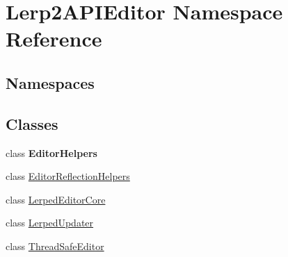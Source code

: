 \hypertarget{namespace_lerp2_a_p_i_editor}{}\section{Lerp2\+A\+P\+I\+Editor Namespace Reference}
\label{namespace_lerp2_a_p_i_editor}
\subsection*{Namespaces}
\begin{DoxyCompactItemize}
\end{DoxyCompactItemize}
\subsection*{Classes}
\begin{DoxyCompactItemize}
\item 
class {\bfseries Editor\+Helpers}
\item 
class \hyperlink{class_lerp2_a_p_i_editor_1_1_editor_reflection_helpers}{Editor\+Reflection\+Helpers}
\item 
class \hyperlink{class_lerp2_a_p_i_editor_1_1_lerped_editor_core}{Lerped\+Editor\+Core}
\item 
class \hyperlink{class_lerp2_a_p_i_editor_1_1_lerped_updater}{Lerped\+Updater}
\item 
class \hyperlink{class_lerp2_a_p_i_editor_1_1_thread_safe_editor}{Thread\+Safe\+Editor}
\end{DoxyCompactItemize}
